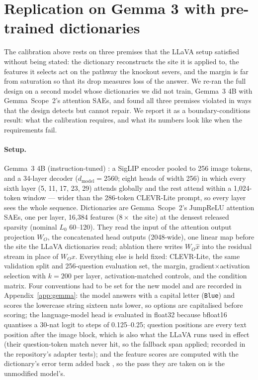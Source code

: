 \documentclass[11pt,a4paper]{article}
\begin{document}
  \newcommand{\gemmastandalone}{}
\fi

\section{Replication on Gemma 3 with pre-trained dictionaries}
\label{sec:gemma}

The calibration above rests on three premises that the LLaVA setup satisfied
without being stated: the dictionary reconstructs the site it is applied to,
the features it selects act on the pathway the knockout severs, and the margin
is far from saturation so that its drop measures loss of the answer. We
re-ran the full design on a second model whose dictionaries we did not train,
Gemma~3 4B with Gemma~Scope~2's attention SAEs, and found all three premises
violated in ways that the design detects but cannot repair. We report it as a
boundary-conditions result: what the calibration requires, and what its numbers
look like when the requirements fail.

\paragraph{Setup.} Gemma~3 4B (instruction-tuned) \citep{gemma3}: a SigLIP
encoder pooled to 256 image tokens, and a 34-layer decoder
($d_{\text{model}} = 2560$; eight heads of width 256) in which every sixth
layer (5, 11, 17, 23, 29) attends globally and the rest attend within a
1{,}024-token window --- wider than the 286-token CLEVR-Lite prompt, so every
layer sees the whole sequence. Dictionaries are Gemma~Scope~2's
\citep{gemmascope2} JumpReLU \citep{rajamanoharan2024jumprelu} attention SAEs,
one per layer, 16{,}384 features ($8\times$ the site) at the densest released
sparsity (nominal $L_0$ 60--120). They read the input of the attention output
projection $W_O$, the concatenated head outputs (2048-wide), one linear map
before the site the LLaVA dictionaries read; ablation there writes
$W_O\hat{x}$ into the residual stream in place of $W_O x$. Everything else is
held fixed: CLEVR-Lite, the same validation split and 256-question evaluation
set, the margin, gradient$\times$activation selection with $k=200$ per layer,
activation-matched controls, and the condition matrix. Four conventions had to
be set for the new model and are recorded in Appendix~\ref{app:gemma}: the
model answers with a capital letter (\texttt{Blue}) and scores the lowercase
string sixteen nats lower, so options are capitalised before scoring; the
language-model head is evaluated in float32 because bfloat16 quantises a
30-nat logit to steps of 0.125--0.25; question positions are every text
position after the image block, which is also what the LLaVA runs used in
effect (their question-token match never hit, so the fallback span applied;
recorded in the repository's adapter tests); and the feature scores are computed with the
dictionary's error term added back \citep{marks2024sparsefeaturecircuits}, so
the pass they are taken on is the unmodified model's.
\end{document}
